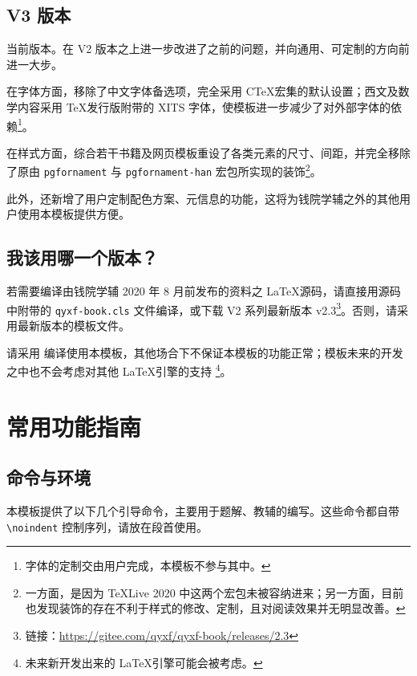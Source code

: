 \documentclass[
  10pt,
  twoside,
  openany,
  b5paper, %
  colorscheme = basic, %
]{qyxf-book}
\begin{document}
\subsection{V3 版本}

当前版本。在 V2 版本之上进一步改进了之前的问题，并向通用、可定制的方向前进一大步。

在字体方面，移除了中文字体备选项，完全采用 C\TeX 宏集的默认设置；西文及数学内容采用 \TeX 发行版附带的 XITS 字体，使模板进一步减少了对外部字体的依赖\footnote{字体的定制交由用户完成，本模板不参与其中。}。

在样式方面，综合若干书籍及网页模板重设了各类元素的尺寸、间距，并完全移除了原由 \verb|pgfornament| 与 \verb|pgfornament-han| 宏包所实现的装饰\footnote{一方面，是因为 \TeX Live 2020 中这两个宏包未被容纳进来；另一方面，目前也发现装饰的存在不利于样式的修改、定制，且对阅读效果并无明显改善。}。

此外，还新增了用户定制配色方案、元信息的功能，这将为钱院学辅之外的其他用户使用本模板提供方便。

\subsection{我该用哪一个版本？}

若需要编译由钱院学辅 2020 年 8 月前发布的资料之 \LaTeX 源码，请直接用源码中附带的 \verb|qyxf-book.cls| 文件编译，或下载 V2 系列最新版本 v2.3\footnote{链接：\url{https://gitee.com/qyxf/qyxf-book/releases/2.3}}。否则，请采用最新版本的模板文件。

\begin{alert}
  请采用  编译使用本模板，其他场合下不保证本模板的功能正常；模板未来的开发之中也不会考虑对其他 \LaTeX 引擎的支持
  \footnote{未来新开发出来的 \LaTeX 引擎可能会被考虑。}。
\end{alert}

\section{常用功能指南}

\subsection{命令与环境}

本模板提供了以下几个引导命令，主要用于题解、教辅的编写。这些命令都自带 \verb|\noindent| 控制序列，请放在段首使用。
\end{document}
